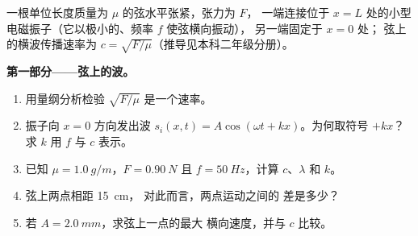 \begin{problem}
\label{pb:b1:wave-propagation:1}
一根单位长度质量为 $\mu$ 的弦水平张紧，张力为 $F$，
一端连接位于 $x = L$ 处的小型电磁振子（它以极小的、频率 $f$ 使弦横向振动），
另一端固定于 $x = 0$ 处；
弦上的横波传播速率为
$c = \sqrt{F/\mu}$（推导见本科二年级分册）。

\medskip
\noindent\textbf{第一部分——弦上的波。}
\begin{enumerate}
  \item 用量纲分析检验 $\sqrt{F/\mu}$ 是一个速率。
  \item 振子向 $x = 0$ 方向发出波
        $s_i(x, t) = A\cos(\omega t + kx)$。为何取符号 $+kx$？求 $k$
        用 $f$ 与 $c$ 表示。
  \item 已知 $\mu = \qty{1.0}{g/m}$，$F = \qty{0.90}{N}$ 且
        $f = \qty{50}{Hz}$，计算 $c$、$\lambda$ 和 $k$。
  \item 弦上两点相距 \qty{15}{cm}，
        对此而言，两点运动之间的
        差是多少？
  \item 若 $A = \qty{2.0}{mm}$，求弦上一点的最大
        横向速度，并与 $c$ 比较。
\end{enumerate}


\end{problem}
